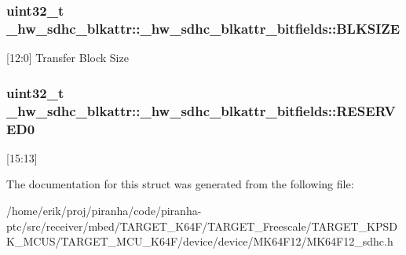 \subsubsection[{\texorpdfstring{B\+L\+K\+S\+I\+ZE}{BLKSIZE}}]{\setlength{\rightskip}{0pt plus 5cm}uint32\+\_\+t \+\_\+hw\+\_\+sdhc\+\_\+blkattr\+::\+\_\+hw\+\_\+sdhc\+\_\+blkattr\+\_\+bitfields\+::\+B\+L\+K\+S\+I\+ZE}\hypertarget{struct__hw__sdhc__blkattr_1_1__hw__sdhc__blkattr__bitfields_a609dd8d372c2a813cd26a783ebe79d18}{}\label{struct__hw__sdhc__blkattr_1_1__hw__sdhc__blkattr__bitfields_a609dd8d372c2a813cd26a783ebe79d18}
\mbox{[}12\+:0\mbox{]} Transfer Block Size 
\subsubsection[{\texorpdfstring{R\+E\+S\+E\+R\+V\+E\+D0}{RESERVED0}}]{\setlength{\rightskip}{0pt plus 5cm}uint32\+\_\+t \+\_\+hw\+\_\+sdhc\+\_\+blkattr\+::\+\_\+hw\+\_\+sdhc\+\_\+blkattr\+\_\+bitfields\+::\+R\+E\+S\+E\+R\+V\+E\+D0}\hypertarget{struct__hw__sdhc__blkattr_1_1__hw__sdhc__blkattr__bitfields_a4d4523e8fc6131cff737460a23778bca}{}\label{struct__hw__sdhc__blkattr_1_1__hw__sdhc__blkattr__bitfields_a4d4523e8fc6131cff737460a23778bca}
\mbox{[}15\+:13\mbox{]} 

The documentation for this struct was generated from the following file\+:\begin{DoxyCompactItemize}
\item 
/home/erik/proj/piranha/code/piranha-\/ptc/src/receiver/mbed/\+T\+A\+R\+G\+E\+T\+\_\+\+K64\+F/\+T\+A\+R\+G\+E\+T\+\_\+\+Freescale/\+T\+A\+R\+G\+E\+T\+\_\+\+K\+P\+S\+D\+K\+\_\+\+M\+C\+U\+S/\+T\+A\+R\+G\+E\+T\+\_\+\+M\+C\+U\+\_\+\+K64\+F/device/device/\+M\+K64\+F12/M\+K64\+F12\+\_\+sdhc.\+h\end{DoxyCompactItemize}
